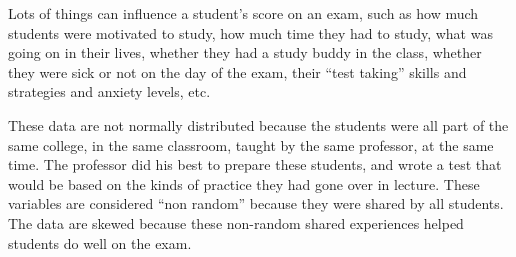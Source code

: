 \documentclass[
  letterpaper,
  DIV=11,
  numbers=noendperiod,
  oneside]{scrreprt}
\begin{document}
\begin{tcolorbox}[enhanced jigsaw, toptitle=1mm, toprule=.15mm, rightrule=.15mm, breakable, left=2mm, colbacktitle=quarto-callout-tip-color!10!white, colback=white, opacityback=0, coltitle=black, bottomtitle=1mm, opacitybacktitle=0.6, titlerule=0mm, leftrule=.75mm, arc=.35mm, bottomrule=.15mm, title=\textcolor{quarto-callout-tip-color}{\faLightbulb}\hspace{0.5em}{``Random'' Reasons for Variation}, colframe=quarto-callout-tip-color-frame]

Lots of things can influence a student's score on an exam, such as how
much students were motivated to study, how much time they had to study,
what was going on in their lives, whether they had a study buddy in the
class, whether they were sick or not on the day of the exam, their
``test taking'' skills and strategies and anxiety levels, etc.

\end{tcolorbox}

\begin{tcolorbox}[enhanced jigsaw, toptitle=1mm, toprule=.15mm, rightrule=.15mm, breakable, left=2mm, colbacktitle=quarto-callout-tip-color!10!white, colback=white, opacityback=0, coltitle=black, bottomtitle=1mm, opacitybacktitle=0.6, titlerule=0mm, leftrule=.75mm, arc=.35mm, bottomrule=.15mm, title=\textcolor{quarto-callout-tip-color}{\faLightbulb}\hspace{0.5em}{``Non-Random'' Reasons for Variation.}, colframe=quarto-callout-tip-color-frame]

These data are not normally distributed because the students were all
part of the same college, in the same classroom, taught by the same
professor, at the same time. The professor did his best to prepare these
students, and wrote a test that would be based on the kinds of practice
they had gone over in lecture. These variables are considered ``non
random'' because they were shared by all students. The data are skewed
because these non-random shared experiences helped students do well on
the exam.

\end{tcolorbox}

\subsubsection{}\label{section}
\end{document}
